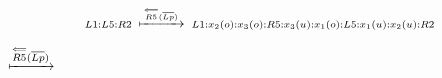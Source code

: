 
\begin{frame}{\name}
$$\scriptstyle
L1:L5:R2\enspace\xmapsto{\overset\Longleftarrow{R5}(\overline{Lp})}\enspace L1:x_2(o):{x_3(o):R5:x_3(u)}:x_1(o):L5:x_1(u):x_2(u):R2
$$

\begin{center}
$\xmapsto{\overset\Longleftarrow{R5}(\overline{Lp})}$
\end{center}
\end{frame}